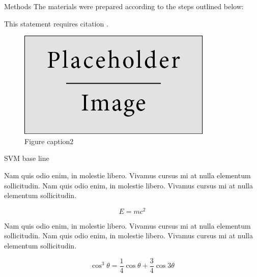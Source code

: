 \documentclass[final]{beamer}
\newlength{\onecolwid}
\begin{document}
\begin{frame}[t]
\begin{columns}[t]
\begin{column}{\onecolwid}
\begin{block}{Methods}
		The materials were prepared according to the steps outlined below:
		
		
		This statement requires citation \cite{Smith:2012qr}.
		\begin{figure}
			\includegraphics[width=0.8\linewidth]{placeholder.jpg}
			\caption{Figure caption2}
		\end{figure}
		
	\end{block}
	


\begin{block}{SVM base line}

Nam quis odio enim, in molestie libero. Vivamus cursus mi at nulla elementum sollicitudin. Nam quis odio enim, in molestie libero. Vivamus cursus mi at nulla elementum sollicitudin.
  
\begin{equation}
E = mc^{2}
\label{eqn:Einstein}
\end{equation}

Nam quis odio enim, in molestie libero. Vivamus cursus mi at nulla elementum sollicitudin. Nam quis odio enim, in molestie libero. Vivamus cursus mi at nulla elementum sollicitudin.

\begin{equation}
\cos^3 \theta =\frac{1}{4}\cos\theta+\frac{3}{4}\cos 3\theta
\label{eq:refname}
\end{equation}

\end{block}


\end{column} %







\end{columns}
\end{frame}
\end{document}
